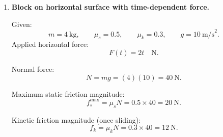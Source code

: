 \documentclass[12pt]{article}
\begin{document}
\begin{enumerate}
Before breakup, the body was at rest, so initial total momentum was zero:
\[
\mathbf{p}_\text{total, initial} = \mathbf{0}.
\]
Momentum is conserved, so the vector sum of the fragment momenta after breakup must still be zero:
\[
m_1 \mathbf{v}_1 + m_2 \mathbf{v}_2 + m_3 \mathbf{v}_3 = \mathbf{0}.
\]
Solve for $\mathbf{v}_3$:
\[
m_3 \mathbf{v}_3 = - \left( m_1 \mathbf{v}_1 + m_2 \mathbf{v}_2 \right).
\]

First compute the known momenta:
\[
m_1 \mathbf{v}_1 = (3~\text{kg})(4~\text{m/s})\,\hat{\imath}
= 12\,\hat{\imath}~\text{kg}\cdot\text{m/s},
\]
\[
m_2 \mathbf{v}_2 = (4~\text{kg})(3~\text{m/s})\,\hat{\jmath}
= 12\,\hat{\jmath}~\text{kg}\cdot\text{m/s}.
\]

Thus
\[
m_1 \mathbf{v}_1 + m_2 \mathbf{v}_2
= 12\,\hat{\imath} + 12\,\hat{\jmath}
\quad (\text{kg}\cdot\text{m/s}).
\]

So
\[
m_3 \mathbf{v}_3
= - (12\,\hat{\imath} + 12\,\hat{\jmath})
= (-12)\,\hat{\imath} + (-12)\,\hat{\jmath}.
\]

Since $m_3=6~\text{kg}$,
\[
\mathbf{v}_3
= \frac{1}{6}(-12\,\hat{\imath} - 12\,\hat{\jmath})
= (-2)\,\hat{\imath} + (-2)\,\hat{\jmath}
\quad \text{m/s}.
\]

So the third fragment moves with velocity
\[
\mathbf{v}_3 = (-2, -2)~\text{m/s}.
\]

Speed:
\[
v_3 = \sqrt{(-2)^2 + (-2)^2}
= \sqrt{4+4}
= \sqrt{8}
= 2\sqrt{2} \approx 2.83~\text{m/s}.
\]

Direction: both components are negative, so it moves toward the southwest, at $45^\circ$ below the $-x$ axis (i.e. equally south and west).

We can express the direction angle $\theta$ measured from due west toward south:
\[
\tan \theta = \frac{2}{2} = 1
\quad\Rightarrow\quad
\theta = 45^\circ.
\]

Thus $m_3$ moves to the southwest at $2\sqrt{2}~\text{m/s}$.


\item \textbf{Block on horizontal surface with time-dependent force.}

Given:
\[
m = 4~\text{kg}, \qquad
\mu_s = 0.5, \qquad
\mu_k = 0.3, \qquad
g=10~\text{m/s}^2.
\]
Applied horizontal force:
\[
F(t) = 2t \quad \text{N}.
\]

Normal force:
\[
N = mg = (4)(10) = 40~\text{N}.
\]

Maximum static friction magnitude:
\[
f_s^{\max} = \mu_s N = 0.5 \times 40 = 20~\text{N}.
\]

Kinetic friction magnitude (once sliding):
\[
f_k = \mu_k N = 0.3 \times 40 = 12~\text{N}.
\]


\end{enumerate}
\end{document}
